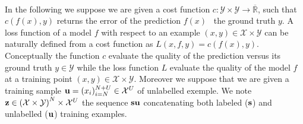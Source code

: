 \paragraph{}
In the following we suppose we are given a cost function $c:\mathcal{Y}\times\mathcal{Y}\to\overline{\mathbb{R}}$, such that $c(f(x),y)$ returns the error of the prediction $f(x)$ \wrt~the ground truth $y$. A loss function of a model $f$ with respect to an example $(x,y)\in\mathcal{X}\times\mathcal{Y}$ can be naturally defined from a cost function as $L(x,f,y)=c(f(x),y)$. Conceptually the function $c$ evaluate the quality of the prediction versus its ground truth $y\in\mathcal{Y}$ while the loss function $L$ evaluate the quality of the model $f$ at a training point $(x,y)\in\mathcal{X}\times\mathcal{Y}$. Moreover we suppose that we are given a training sample $\boldsymbol{\mathbf{u}}=(x_i)_{i=N}^{N+U}\in\mathcal{X}^U$ of unlabelled exemple. We note $\boldsymbol{\mathbf{z}}\in\left(\mathcal{X}\times\mathcal{Y}\right)^N\times\mathcal{X}^U$ the sequence $\boldsymbol{\mathbf{s}}\boldsymbol{\mathbf{u}}$ concatenating both labeled ($\boldsymbol{\mathbf{s}}$) and unlabelled ($\boldsymbol{\mathbf{u}}$) training examples.
